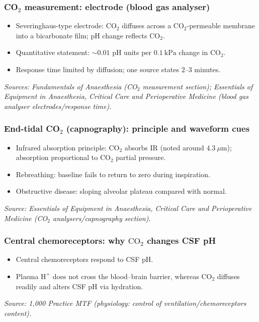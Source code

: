\documentclass[11pt,a4paper]{article}
\begin{document}
\subsubsection{CO\(_2\) measurement: electrode (blood gas analyser)}
\begin{itemize}
  \item Severinghaus-type electrode: \(\mathrm{CO_2}\) diffuses across a CO\(_2\)-permeable membrane into a bicarbonate film; pH change reflects \(\mathrm{CO_2}\).
  \item Quantitative statement: \(\sim 0.01\) pH units per \(0.1~\mathrm{kPa}\) change in \(\mathrm{CO_2}\).
  \item Response time limited by diffusion; one source states \(2\)--\(3\) minutes.
\end{itemize}
\textit{Sources: Fundamentals of Anaesthesia (CO\(_2\) measurement section); Essentials of Equipment in Anaesthesia, Critical Care and Perioperative Medicine (blood gas analyser electrodes/response time).}

\subsubsection{End-tidal CO\(_2\) (capnography): principle and waveform cues}
\begin{itemize}
  \item Infrared absorption principle: \(\mathrm{CO_2}\) absorbs IR (noted around \(4.3~\mu\mathrm{m}\)); absorption proportional to \(\mathrm{CO_2}\) partial pressure.
  \item Rebreathing: baseline fails to return to zero during inspiration.
  \item Obstructive disease: sloping alveolar plateau compared with normal.
\end{itemize}
\textit{Source: Essentials of Equipment in Anaesthesia, Critical Care and Perioperative Medicine (CO\(_2\) analysers/capnography section).}

\subsubsection{Central chemoreceptors: why \(\mathrm{CO_2}\) changes CSF pH}
\begin{itemize}
  \item Central chemoreceptors respond to CSF pH.
  \item Plasma \(\mathrm{H^+}\) does not cross the blood--brain barrier, whereas \(\mathrm{CO_2}\) diffuses readily and alters CSF pH via hydration.
\end{itemize}
\textit{Source: 1,000 Practice MTF (physiology: control of ventilation/chemoreceptors content).}
\end{document}
